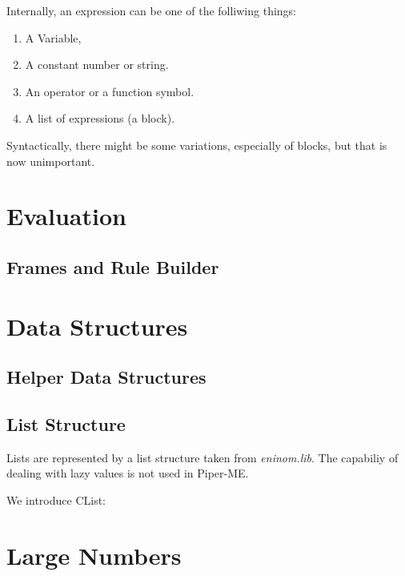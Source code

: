 Internally, an expression can be one of the folliwing things:

\begin{enumerate}
\item A Variable,
\item A constant number or string.
\item An operator or a function symbol.
\item A list of expressions (a block).
\end{enumerate}

Syntactically, there might be some variations, especially of blocks, but that is 
now unimportant.




\chapter{Evaluation}

\section{Frames and Rule Builder}




\chapter{Data Structures}

\section{Helper Data Structures}


\section{List Structure}

Lists are represented by a list structure taken from {\em eninom.lib}. The capabiliy
of dealing with lazy values is not used in Piper-ME.

We introduce CList:
 


\chapter{Large Numbers}





